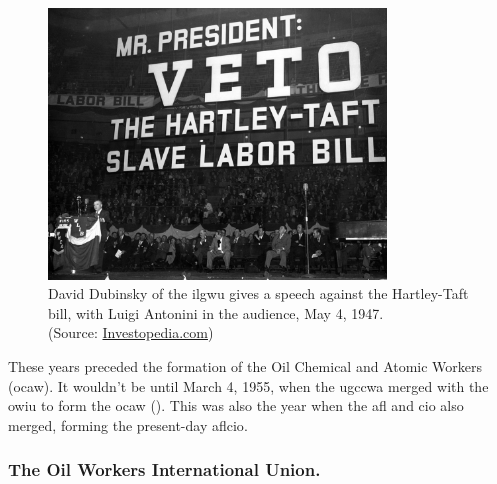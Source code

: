 \documentclass[12pt]{article}
\newcommand{\imageWidth}{0.8\textwidth}
\begin{document}
\begin{figure}[ht]
  \centering
  \includegraphics[width=\imageWidth]{images/slave_labor_bill}
  \captionsetup{justification=centering, singlelinecheck=false, margin=2cm} 
  \caption[Anti-Hartley-Taft Rally]{David Dubinsky of the \acrfull{ilgwu} gives a speech against the Hartley-Taft bill, with Luigi Antonini in the audience, May 4, 1947.\\ (Source: \href{https://www.investopedia.com/thmb/VcswppMRTl8IqMbgLRqdigfIGvs=/1500x0/filters:no_upscale():max_bytes(150000):strip_icc()/5278798677_0429e6aa05_k-7b6b81bdbbe44cdb929c08c7da9f8d29.jpg}{Investopedia.com}) \nocite{investopediaMrPresidentVeto}}
  \label{fig:slave_labor_bill}
\end{figure}

These years preceded the formation of the Oil Chemical and Atomic Workers (\acrshort{ocaw}). It wouldn’t be until March 4, 1955, when the \acrfull{ugccwa} merged with the \acrfull{owiu} to form the \acrshort{ocaw} (\cite[48]{ocawFactBookOil1960}). This was also the year when the \acrshort{afl} and \acrshort{cio} also merged, forming the present-day \acrfull{aflcio}.

\subsubsection{The Oil Workers International Union.}
\end{document}
